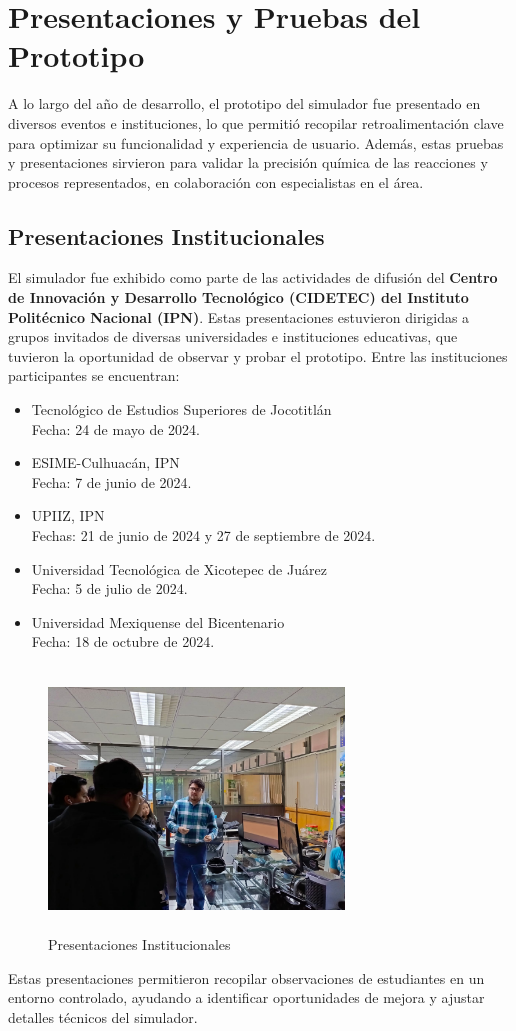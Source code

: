 \chapter{Presentaciones y Pruebas del Prototipo}\label{ch:Pruebas}
A lo largo del año de desarrollo, el prototipo del simulador fue presentado en diversos eventos e instituciones, lo que permitió recopilar retroalimentación clave para optimizar su funcionalidad y experiencia de usuario. Además, estas pruebas y presentaciones sirvieron para validar la precisión química de las reacciones y procesos representados, en colaboración con especialistas en el área.

\section{Presentaciones Institucionales}
El simulador fue exhibido como parte de las actividades de difusión del \textbf{Centro de Innovación y Desarrollo Tecnológico (CIDETEC) del Instituto Politécnico Nacional (IPN)}. Estas presentaciones estuvieron dirigidas a grupos invitados de diversas universidades e instituciones educativas, que tuvieron la oportunidad de observar y probar el prototipo. Entre las instituciones participantes se encuentran:
\begin{itemize}
    \item Tecnológico de Estudios Superiores de Jocotitlán\\
    Fecha: 24 de mayo de 2024.
    \item ESIME-Culhuacán, IPN\\
    Fecha: 7 de junio de 2024.
    \item UPIIZ, IPN\\
    Fechas: 21 de junio de 2024 y 27 de septiembre de 2024.
    \item Universidad Tecnológica de Xicotepec de Juárez\\
    Fecha: 5 de julio de 2024.
    \item Universidad Mexiquense del Bicentenario\\
    Fecha: 18 de octubre de 2024.
\end{itemize}
\begin{figure}[thbp]
    \centering
    \includegraphics[width=0.7\textwidth, height = 7cm]{img/chapter06/CIDETEC.jpg}
    \caption{Presentaciones Institucionales}
    \label{fig:CIDETEC}
\end{figure}
Estas presentaciones permitieron recopilar observaciones de estudiantes en un entorno controlado, ayudando a identificar oportunidades de mejora y ajustar detalles técnicos del simulador.
\newline
